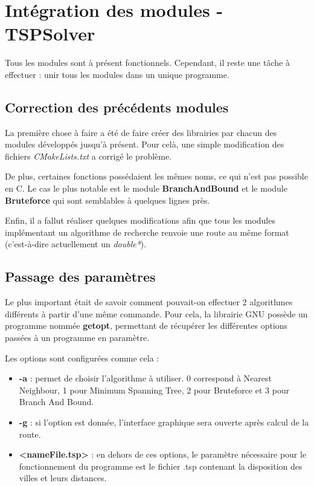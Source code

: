 \chapter{Intégration des modules - TSPSolver}

Tous les modules sont à présent fonctionnels. Cependant, il reste une tâche à effectuer : unir tous les modules dans un unique programme.

\section{Correction des précédents modules}

La première chose à faire a été de faire créer des librairies par chacun des modules développés jusqu'à présent. Pour celà, une simple modification des fichiers \textit{CMakeLists.txt} a corrigé le problème.

De plus, certaines fonctions possédaient les mêmes noms, ce qui n'est pas possible en C. Le cas le plus notable est le module \textbf{BranchAndBound} et le module \textbf{Bruteforce} qui sont semblables à quelques lignes près.

Enfin, il a fallut réaliser quelques modifications afin que tous les modules implémentant un algorithme de recherche renvoie une route au même format (c'est-à-dire actuellement un \textit{double*}).

\section{Passage des paramètres}

Le plus important était de savoir comment pouvait-on effectuer 2 algorithmes différents à partir d'une même commande. Pour cela, la librairie GNU possède un programme nommée \textbf{getopt}, permettant de récupérer les différentes options passées à un programme en paramètre.

Les options sont configurées comme cela :
\begin{itemize}
	\item \textbf{-a} : permet de choisir l'algorithme à utiliser. 0 correspond à Nearest Neighbour, 1 pour Minimum Spanning Tree, 2 pour Bruteforce et 3 pour Branch And Bound.
	\item \textbf{-g} : si l'option est donnée, l'interface graphique sera ouverte après calcul de la route.
	\item \textbf{<nameFile.tsp>} : en dehors de ces options, le paramètre nécessaire pour le fonctionnement du programme est le fichier .tsp contenant la disposition des villes et leurs distances.
\end{itemize}

